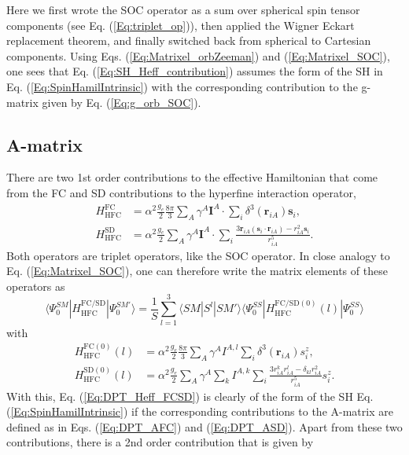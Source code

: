 Here we first wrote the SOC operator as a sum over spherical spin tensor components (see Eq. (\ref{Eq:triplet_op})), then applied the Wigner Eckart replacement theorem,\cite{McWee_1992_} and finally switched back from spherical to Cartesian components.
Using Eqs. (\ref{Eq:Matrixel_orbZeeman}) and (\ref{Eq:Matrixel_SOC}), one sees that Eq. (\ref{Eq:SH_Heff_contribution}) assumes the form of the SH in Eq. (\ref{Eq:SpinHamilIntrinsic}) with the corresponding contribution to the g-matrix given by Eq. (\ref{Eq:g_orb_SOC}).

\subsection{A-matrix}
There are two 1st order contributions to the effective Hamiltonian that come from the FC and SD contributions to the hyperfine interaction operator,
\begin{align}
H_\text{HFC}^\text{FC} &= \alpha^2 \frac{g_e}{2}\frac{8\pi}{3}\sum_A \gamma^A \mathbf{I}^A \cdot \sum_i \delta^3(\mathbf{r}_{iA})\mathbf{s}_i, \\
H_\text{HFC}^\text{SD} &= \alpha^2 \frac{g_e}{2}\sum_A \gamma^A \mathbf{I}^A \cdot \sum_i \frac{3\mathbf{r}_{iA}(\mathbf{s}_i\cdot \mathbf{r}_{iA}) - r_{iA}^2 \mathbf{s}_i}{r_{iA}^5}.
\end{align}
Both operators are triplet operators, like the SOC operator. In close analogy to Eq. (\ref{Eq:Matrixel_SOC}), one can therefore write the matrix elements of these operators as
\begin{equation}
\label{Eq:DPT_Heff_FCSD}
\langle \Psi_0^{SM}|H_\text{HFC}^\text{FC/SD}|\Psi_0^{SM'}\rangle = \frac{1}{S} \sum_{l=1}^3 \langle SM|S^l|SM'\rangle\langle \Psi_0^{SS}|H_\text{HFC}^{\text{FC/SD}(0)}(l)|\Psi_0^{SS}\rangle
\end{equation}
with
\begin{align}
H_\text{HFC}^{\text{FC}(0)}(l) &= \alpha^2 \frac{g_e}{2} \frac{8\pi}{3} \sum_A \gamma^A I^{A,l} \sum_i \delta^3(\mathbf{r}_{iA})s_i^z, \\
H_\text{HFC}^{\text{SD}(0)}(l) &= \alpha^2 \frac{g_e}{2} \sum_A \gamma^A \sum_k I^{A,k} \sum_i \frac{3r_{iA}^k r_{iA}^l - \delta_{kl} r_{iA}^2}{r_{iA}^5} s_i^z.
\end{align}
With this, Eq. (\ref{Eq:DPT_Heff_FCSD}) is clearly of the form of the SH Eq. (\ref{Eq:SpinHamilIntrinsic}) if the corresponding contributions to the A-matrix are defined as in Eqs. (\ref{Eq:DPT_AFC}) and (\ref{Eq:DPT_ASD}). Apart from these two contributions, there is a 2nd order contribution that is given by
